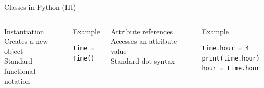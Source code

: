 \documentclass[10pt,compress]{beamer} %
\begin{document}
\begin{frame}[fragile]{Classes in Python (III)}
    \begin{columns}
	   		\begin{block}{Instantiation}
			Creates a new object\\
			Standard functional notation\\
			\bigskip
			\\
	   		\end{block}
	   		\begin{exampleblock}{Example}
\begin{verbatim}
time = Time()
\end{verbatim}
	   		\end{exampleblock}
	   		\begin{block}{Attribute references}
			Accesses an attribute value\\
			Standard dot syntax\\
			\bigskip
			\\
	   		\end{block}
	   		\begin{exampleblock}{Example}
\begin{verbatim}
time.hour = 4
print(time.hour)
hour = time.hour
\end{verbatim}
	   		\end{exampleblock}

	\end{columns}
\end{frame}
\end{document}
